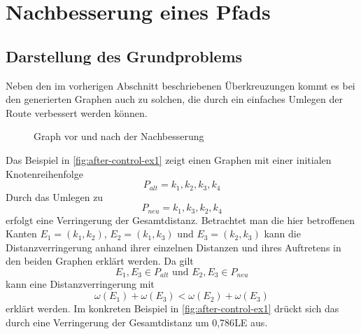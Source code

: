 \section{Nachbesserung eines Pfads}
\subsection{Darstellung des Grundproblems}
Neben den im vorherigen Abschnitt beschriebenen Überkreuzungen kommt es bei den generierten Graphen auch zu solchen, die durch ein einfaches Umlegen der Route verbessert werden können.

\begin{figure}[h]
    \begin{center}
    
    \hfil
    \end{center}
    \caption{Graph vor und nach der Nachbesserung}
    \label{fig:after-control-ex1}
\end{figure}

Das Beispiel in \vref{fig:after-control-ex1} zeigt einen Graphen mit einer initialen Knotenreihenfolge
$$P_{alt} = k_1,k_2,k_3,k_4$$
Durch das Umlegen zu
$$P_{neu} =k_1,k_3,k_2,k_4$$
erfolgt eine Verringerung der Gesamtdistanz.
Betrachtet man die hier betroffenen Kanten $E_1 = (k_1,k_2)$, $ E_2 = (k_1,k_3)$ und $E_3=(k_2,k_3)$ kann die Distanzverringerung anhand ihrer einzelnen Distanzen und ihres Auftretens in den beiden Graphen erklärt werden.
Da gilt 
$$E_1,E_3\in P_{alt} \textrm{ und } E_2,E_3 \in P_{neu}$$
kann eine Distanzverringerung mit
$$\omega(E_1) + \omega(E_3) < \omega(E_2) + \omega(E_3)$$
erklärt werden.
Im konkreten Beispiel in \vref{fig:after-control-ex1} drückt sich das durch eine Verringerung der Gesamtdistanz um 0,786\ac{LE} aus.


